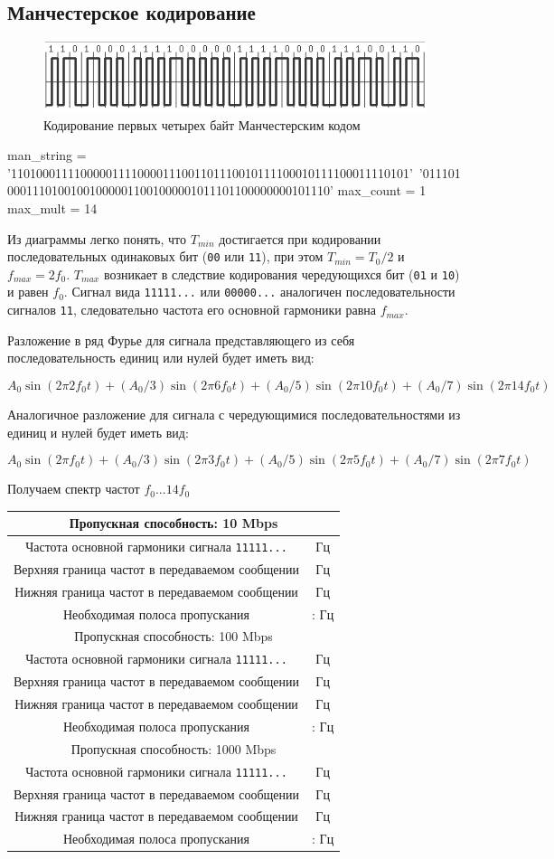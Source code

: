\documentclass[12pt, a4paper]{article}
\newcommand{\bandwidthEntry}[2]{
  \hline
  \multicolumn{2}{|c|}{Пропускная способность: #1 Mbps} \\
  \hline
  Частота основной гармоники сигнала \texttt{11111...} & \py{int(f_0[#1] * #2)} Гц \\
  Верхняя граница частот в передаваемом сообщении & \py{int(max_mult * f_0[#1])} Гц \\
  Нижняя граница частот в передаваемом сообщении & \py{int(f_0[#1] / max_count)} Гц \\
  Необходимая полоса пропускания & \py{int(f_0[#1] / max_count)} : \py{int(max_mult * f_0[#1])} Гц \\
}
\begin{document}
\subsection{Манчестерское кодирование}

\begin{figure}[h]
  \begin{center}
    \includegraphics{manchester}
    \caption{Кодирование первых четырех байт Манчестерским кодом}
  \end{center}
\end{figure}

\begin{pycode}
man_string = '110100011110000011110000111001101110010111100010111100011110101'\
  '011101000111010010010000011001000001011101100000000101110'
max_count = 1
max_mult = 14
\end{pycode}

Из диаграммы легко понять, что $T_{min}$ достигается при кодировании последовательных
одинаковых бит (\texttt{00} или \texttt{11}), при этом $T_{min} = T_0 / 2$ 
и $f_{max} = 2 f_0$. $T_{max}$ возникает в следствие кодирования чередующихся
бит (\texttt{01} и \texttt{10}) и равен $f_0$. Сигнал вида \texttt{11111...} или
\texttt{00000...} аналогичен последовательности сигналов \texttt{11}, следовательно
частота его основной гармоники равна $f_{max}$.

Разложение в ряд Фурье для сигнала представляющего из себя последовательность
единиц или нулей будет иметь вид:

$$A_0 \sin(2 \pi 2 f_0 t) + (A_0 / 3) \sin(2 \pi 6 f_0 t) +
  (A_0 / 5) \sin(2 \pi 10 f_0 t) + (A_0 / 7) \sin(2 \pi 14 f_0 t)$$

Аналогичное разложение для сигнала с чередующимися последовательностями из
единиц и нулей будет иметь вид:

$$A_0 \sin(2 \pi f_0 t) + (A_0 / 3) \sin(2 \pi 3 f_0 t) +
  (A_0 / 5) \sin(2 \pi 5 f_0 t) + (A_0 / 7) \sin(2 \pi 7 f_0 t)$$

Получаем спектр частот $f_0 ... 14 f_0$

\begin{tabular}{| c | c |}
  \bandwidthEntry{10}{2}
  \bandwidthEntry{100}{2}
  \bandwidthEntry{1000}{2}
  \hline
\end{tabular}
\end{document}

